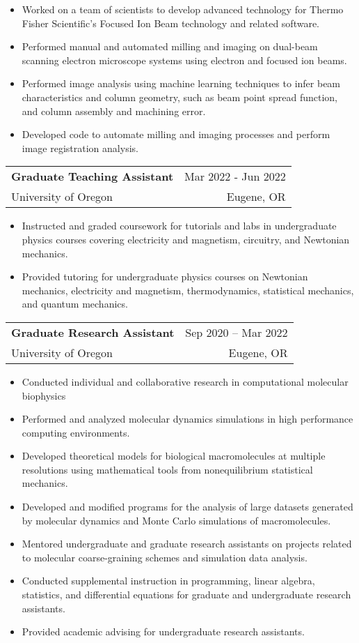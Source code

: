 \documentclass[letterpaper,10.8pt]{article}
\makeatletter
\newcommand{\resumeSubheading}[4]{
  \vspace{-1pt} \item
    \begin{tabular*}{0.97\textwidth}{l@{\extracolsep{\fill}}r}
      \textbf{#1} & #2 \\
      #3  &  #4 \\
    \end{tabular*}\vspace{-5pt}
}
\makeatother
\begin{document}
    \begin{itemize}[label={$\diamond$}]
    \itemsep0em %
    	\item {Worked on a team of scientists to develop advanced technology for Thermo Fisher Scientific's Focused Ion Beam technology and related software.}
	\item {Performed manual and automated milling and imaging on dual-beam scanning
		electron microscope systems using electron and focused ion beams.}
	\item {Performed image analysis using machine learning techniques to infer beam characteristics and column geometry, such as beam point spread function, and column assembly and machining error.}
	\item {Developed code to automate milling and imaging processes and perform image registration analysis.}
	\end{itemize} %

    \resumeSubheading
    {Graduate Teaching Assistant}{Mar 2022 - Jun 2022}
    {University of Oregon}{Eugene, OR}
    
    \begin{itemize}[label={$\diamond$}]
    \itemsep0em  %
	\item {Instructed and graded coursework for tutorials and labs in undergraduate physics courses covering electricity and magnetism, circuitry, and Newtonian mechanics.}
	\item {Provided tutoring for undergraduate physics courses on Newtonian mechanics,
electricity and magnetism, thermodynamics, statistical mechanics, and quantum mechanics.}

	\end{itemize} %
	
    \resumeSubheading
		{Graduate Research Assistant}{Sep 2020 – Mar 2022}
		{University of Oregon}{Eugene, OR}
	\begin{itemize}[label={$\diamond$}]
	\itemsep0em  %
\item{Conducted individual and collaborative research in computational molecular biophysics}
\item{Performed and analyzed molecular dynamics simulations in high performance computing environments.}
\item{Developed theoretical models for biological macromolecules at multiple
resolutions using mathematical tools from nonequilibrium statistical mechanics.}
\item{Developed and modified programs for the analysis of large datasets generated by molecular dynamics and Monte Carlo simulations of macromolecules.}
\item{Mentored undergraduate and graduate research assistants on projects related
to molecular coarse-graining schemes and simulation data analysis.}
\item{Conducted supplemental instruction in programming, linear algebra, statistics, and differential equations for graduate and undergraduate research assistants.}
\item{Provided academic advising for undergraduate research assistants.}
	\end{itemize} %
\end{document}
